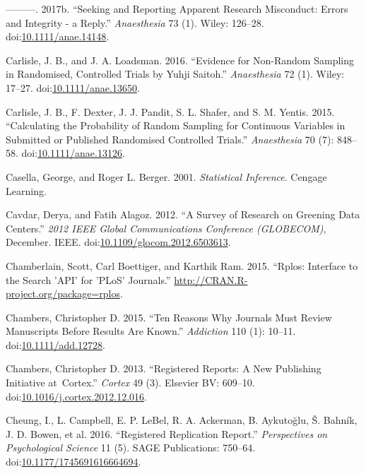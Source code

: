 \documentclass[a5paper]{book}
\begin{document}
\hypertarget{ref-doi:10.1111ux2fanae.14148}{}
---------. 2017b. ``Seeking and Reporting Apparent Research Misconduct:
Errors and Integrity - a Reply.'' \emph{Anaesthesia} 73 (1). Wiley:
126--28.
doi:\href{https://doi.org/10.1111/anae.14148}{10.1111/anae.14148}.

\hypertarget{ref-doi:10.1111ux2fanae.13650}{}
Carlisle, J. B., and J. A. Loadsman. 2016. ``Evidence for Non-Random
Sampling in Randomised, Controlled Trials by Yuhji Saitoh.''
\emph{Anaesthesia} 72 (1). Wiley: 17--27.
doi:\href{https://doi.org/10.1111/anae.13650}{10.1111/anae.13650}.

\hypertarget{ref-doi:10.1111ux2fanae.13126}{}
Carlisle, J. B., F. Dexter, J. J. Pandit, S. L. Shafer, and S. M.
Yentis. 2015. ``Calculating the Probability of Random Sampling for
Continuous Variables in Submitted or Published Randomised Controlled
Trials.'' \emph{Anaesthesia} 70 (7): 848--58.
doi:\href{https://doi.org/10.1111/anae.13126}{10.1111/anae.13126}.

\hypertarget{ref-isbn:9780534243128}{}
Casella, George, and Roger L. Berger. 2001. \emph{Statistical
Inference}. Cengage Learning.

\hypertarget{ref-doi:10.1109ux2fglocom.2012.6503613}{}
Cavdar, Derya, and Fatih Alagoz. 2012. ``A Survey of Research on
Greening Data Centers.'' \emph{2012 IEEE Global Communications
Conference (GLOBECOM)}, December. IEEE.
doi:\href{https://doi.org/10.1109/glocom.2012.6503613}{10.1109/glocom.2012.6503613}.

\hypertarget{ref-Chamberlain2015-tg}{}
Chamberlain, Scott, Carl Boettiger, and Karthik Ram. 2015. ``Rplos:
Interface to the Search 'API' for 'PLoS' Journals.''
\url{http://CRAN.R-project.org/package=rplos}.

\hypertarget{ref-doi:10.1111ux2fadd.12728}{}
Chambers, Christopher D. 2015. ``Ten Reasons Why Journals Must Review
Manuscripts Before Results Are Known.'' \emph{Addiction} 110 (1):
10--11. doi:\href{https://doi.org/10.1111/add.12728}{10.1111/add.12728}.

\hypertarget{ref-doi:10.1016ux2fj.cortex.2012.12.016}{}
Chambers, Christopher D. 2013. ``Registered Reports: A New Publishing
Initiative at~Cortex.'' \emph{Cortex} 49 (3). Elsevier BV: 609--10.
doi:\href{https://doi.org/10.1016/j.cortex.2012.12.016}{10.1016/j.cortex.2012.12.016}.

\hypertarget{ref-doi:10.1177ux2f1745691616664694}{}
Cheung, I., L. Campbell, E. P. LeBel, R. A. Ackerman, B. Aykutoğlu, Š.
Bahník, J. D. Bowen, et al. 2016. ``Registered Replication Report.''
\emph{Perspectives on Psychological Science} 11 (5). SAGE Publications:
750--64.
doi:\href{https://doi.org/10.1177/1745691616664694}{10.1177/1745691616664694}.
\end{document}
